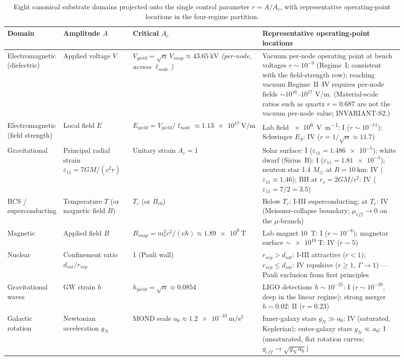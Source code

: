 \begin{table}[htbp]
\centering
\footnotesize
\setlength{\tabcolsep}{4pt}
\begin{tabular}{@{}p{0.13\linewidth} p{0.18\linewidth} p{0.21\linewidth} p{0.42\linewidth}@{}}
\toprule
\textbf{Domain} & \textbf{Amplitude $A$} & \textbf{Critical $A_c$} & \textbf{Representative operating-point locations} \\
\midrule
Electromagnetic (dielectric) & Applied voltage $V$ & $V_{yield} = \sqrt{\alpha}\, V_{snap} \approx \qty{43.65}{\kilo\volt}$ \emph{(per-node, across $\ell_{node}$)} & Vacuum per-node operating point at bench voltages $r\sim10^{-9}$ (Regime~I; consistent with the field-strength row); reaching vacuum Regime~II--IV requires per-node fields $\sim10^{16}$--$10^{17}$ V/m. (Material-scale ratios such as quartz $r=0.687$ are not the vacuum per-node value; INVARIANT-S2.) \\
Electromagnetic (field strength) & Local field $E$ & $E_{yield} = V_{yield}/\ell_{node} \approx \qty{1.13e17}{\volt\per\metre}$ & Lab field \qty{e6}{\volt\per\metre}: I ($r \sim 10^{-11}$); Schwinger $E_S$: IV ($r = 1/\sqrt{\alpha} \approx 11.7$) \\
Gravitational & Principal radial strain $\varepsilon_{11} = 7GM/(c^2 r)$ & Unitary strain $A_c = 1$ & Solar surface: I ($\varepsilon_{11} = \num{1.486e-5}$); white dwarf (Sirius~B): I ($\varepsilon_{11} = \num{1.81e-3}$); neutron star 1.4 $M_\odot$ at $R = \qty{10}{\kilo\metre}$: IV ($\varepsilon_{11} \approx 1.46$); BH at $r_s = 2GM/c^2$: IV ($\varepsilon_{11} = 7/2 = 3.5$) \\
BCS / superconducting & Temperature $T$ (or magnetic field $B$) & $T_c$ (or $B_{c0}$) & Below $T_c$: I-III superconducting; at $T_c$: IV (Meissner-collapse boundary; $\mu_{eff} \to 0$ on the $\mu$-branch) \\
Magnetic & Applied field $B$ & $B_{snap} = m_e^2 c^2/(e\hbar) \approx \qty{1.89e9}{\tesla}$ & Lab magnet \qty{10}{\tesla}: I ($r \sim 10^{-8}$); magnetar surface $\sim \qty{e10}{\tesla}$: IV ($r \sim 5$) \\
Nuclear & Confinement ratio $d_{sat}/r_{sep}$ & 1 (Pauli wall) & $r_{sep} > d_{sat}$: I-III attractive ($r < 1$); $r_{sep} \le d_{sat}$: IV repulsive ($r \ge 1$, $\Gamma \to 1$\gammaundeclared{}) --- Pauli exclusion from first principles \\
Gravitational waves & GW strain $h$ & $h_{yield} = \sqrt{\alpha} \approx 0.0854$ & LIGO detections $h \sim 10^{-21}$: I ($r \sim 10^{-20}$, deep in the linear regime); strong merger $h \sim 0.02$: II ($r = 0.23$) \\
Galactic rotation & Newtonian acceleration $g_N$ & MOND scale $a_0 \approx \qty{1.2e-10}{\metre\per\second\squared}$ & Inner-galaxy stars $g_N \gg a_0$: IV (saturated, Keplerian); outer-galaxy stars $g_N \ll a_0$: I (unsaturated, flat rotation curves; $g_{eff} \to \sqrt{g_N\, a_0}$) \\
\bottomrule
\end{tabular}
\caption{Eight canonical substrate domains projected onto the single control parameter $r=A/A_c$, with representative operating-point locations in the four-regime partition.}
\label{tab:vol9_phase_domain_mapping}
\end{table}

